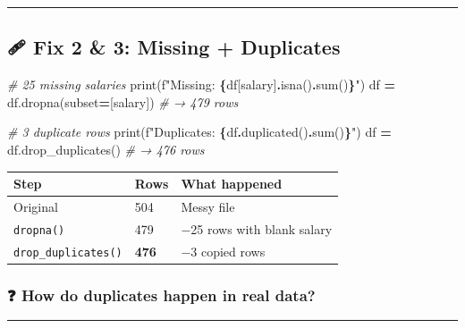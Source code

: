\documentclass[
]{article}
\newenvironment{Shaded}{\begin{snugshade}}{\end{snugshade}}
\newcommand{\BuiltInTok}[1]{#1}
\newcommand{\CommentTok}[1]{\textcolor[rgb]{0.56,0.35,0.01}{\textit{#1}}}
\newcommand{\NormalTok}[1]{#1}
\newcommand{\OperatorTok}[1]{\textcolor[rgb]{0.81,0.36,0.00}{\textbf{#1}}}
\newcommand{\SpecialCharTok}[1]{\textcolor[rgb]{0.81,0.36,0.00}{\textbf{#1}}}
\newcommand{\SpecialStringTok}[1]{\textcolor[rgb]{0.31,0.60,0.02}{#1}}
\newcommand{\StringTok}[1]{\textcolor[rgb]{0.31,0.60,0.02}{#1}}
\begin{document}
\begin{center}\rule{0.5\linewidth}{0.5pt}\end{center}

\subsection{🩹 Fix 2 \& 3: Missing +
Duplicates}\label{fix-2-3-missing-duplicates}

\begin{Shaded}
\begin{Highlighting}[]
\CommentTok{\# 25 missing salaries}
\BuiltInTok{print}\NormalTok{(}\SpecialStringTok{f"Missing: }\SpecialCharTok{\{}\NormalTok{df[}\StringTok{\textquotesingle{}salary\textquotesingle{}}\NormalTok{]}\SpecialCharTok{.}\NormalTok{isna()}\SpecialCharTok{.}\BuiltInTok{sum}\NormalTok{()}\SpecialCharTok{\}}\SpecialStringTok{"}\NormalTok{)}
\NormalTok{df }\OperatorTok{=}\NormalTok{ df.dropna(subset}\OperatorTok{=}\NormalTok{[}\StringTok{\textquotesingle{}salary\textquotesingle{}}\NormalTok{])    }\CommentTok{\# → 479 rows}

\CommentTok{\# 3 duplicate rows}
\BuiltInTok{print}\NormalTok{(}\SpecialStringTok{f"Duplicates: }\SpecialCharTok{\{}\NormalTok{df}\SpecialCharTok{.}\NormalTok{duplicated()}\SpecialCharTok{.}\BuiltInTok{sum}\NormalTok{()}\SpecialCharTok{\}}\SpecialStringTok{"}\NormalTok{)}
\NormalTok{df }\OperatorTok{=}\NormalTok{ df.drop\_duplicates()            }\CommentTok{\# → 476 rows}
\end{Highlighting}
\end{Shaded}

\begin{longtable}[]{@{}lll@{}}
\toprule\noalign{}
Step & Rows & What happened \\
\midrule\noalign{}
\endhead
\bottomrule\noalign{}
\endlastfoot
Original & 504 & Messy file \\
\texttt{dropna()} & 479 & −25 rows with blank salary \\
\texttt{drop\_duplicates()} & \textbf{476} & −3 copied rows \\
\end{longtable}

\subsubsection{❓ How do duplicates happen in real
data?}\label{how-do-duplicates-happen-in-real-data}

\begin{center}\rule{0.5\linewidth}{0.5pt}\end{center}
\end{document}
